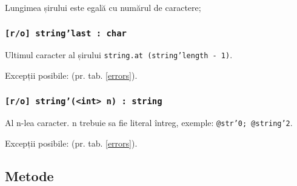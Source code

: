 Lungimea șirului este egală cu numărul de caractere;

\subsubsection{\texttt{[r/o] string'last : char}}

Ultimul caracter al șirului \texttt{string.at (string'length - 1)}.

Excepții posibile:  (pr. tab. \ref{errors}).

\subsubsection{\texttt{[r/o] string'(<int> n) : string}}

Al n-lea caracter. n trebuie sa fie literal întreg, exemple: \texttt{@str'0; @string'2}.

Excepții posibile:  (pr. tab. \ref{errors}).

\subsection{Metode}

